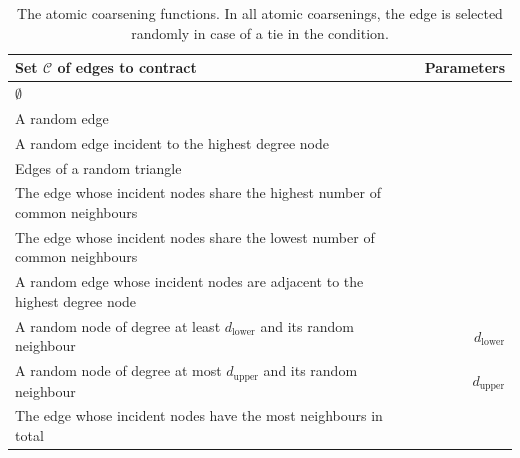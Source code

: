 \begin{table}
  \begin{center}
    \begin{minipage}{\textwidth}
      \caption{The atomic coarsening functions. In all atomic coarsenings, the edge is selected randomly in case of a tie in the condition.}
      \label{tab:atomic-coarsenings}
      \begin{tabularx}{\textwidth}{Xr}
        \toprule
        \textbf{Set \( \mathcal{C} \) of edges to contract}                                                                     & \textbf{Parameters}    \\
        \midrule
        \( \emptyset \)                                                                                                         &                        \\
        A random edge                                                                                                           &                        \\
        A random edge incident to the highest degree node                                                                       &                        \\
        Edges of a random triangle                                                                                              &                        \\
        The edge whose incident nodes share the highest number of common neighbours                                             &                        \\
        The edge whose incident nodes share the lowest number of common neighbours                                              &                        \\
        A random edge whose incident nodes are adjacent to the highest degree node                                              &                        \\
        A random node of degree at least \( d_\mathrm{lower} \) and its random neighbour                                        & \( d_\mathrm{lower} \) \\
        A random node of degree at most \( d_\mathrm{upper} \) and its random neighbour                                         & \( d_\mathrm{upper} \) \\
        The edge whose incident nodes have the most neighbours in total                                                         &                        \\

\end{tabularx}
\end{minipage}
\end{center}
\end{table}
